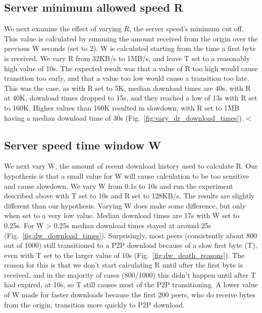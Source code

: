 \subsection{Server minimum allowed speed R}

We next examine the effect of varying $R$, the server speed's minimum cut off. This value is calculated 
by summing the amount received from the origin over the previous W seconds (set to 2). W is calculated 
starting from the time a first byte is received. We vary R from 32KB/s to 1MB/s, and leave T set to a 
reasonably high value of 10s. The expected result was that a value of R too high would cause transition 
too early, and that a value too low would cause a transition too late. This was the case, as with R set 
to 5K, median download times are 40s, with R at 40K, download times dropped to 15s, and they reached 
a low of 13s with R set to 160K. Higher values than 160K resulted in slowdown, with R set to 1MB having 
a median download time of 30s (Fig.~\ref{fig:vary_dr_download_times}). 
<%

\subsection{Server speed time window W}

We next vary W, the amount of recent download history used to calculate R. Our hypothesis is that 
a small value for W will cause calculation to be too sensitive and cause slowdown. We vary W from 0.1s 
to 10s and run the experiment described above with T set to 10s and R set to 128KB/s. The results are 
slightly different than our hypothesis. Varying W does make some difference, but only when set 
to a very low value. Median download times are 17s with W set to 0.25s. For W \textgreater{} 0.25s 
median download times stayed at around 25s (Fig.~\ref{fig:dw_download_times}). Surprisingly, 
most peers (consistently about 800 out of 1000) still transitioned to a P2P download because of 
a slow first byte (T), even with T set to the larger value of 10s (Fig.~\ref{fig:dw_death_reasons}). 
The reason for this is that we don't start calculating R until after the first byte is received, and 
in the majority of cases (800/1000) this didn't happen until after T had expired, at 10s, so T still 
causes most of the P2P transitioning. A lower value of W made for faster downloads because the first 
200 peers, who do receive bytes from the origin, transition more quickly to P2P download. 

